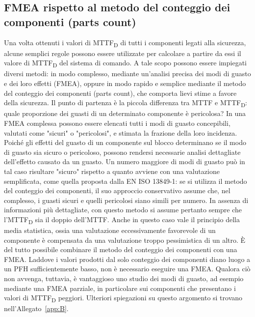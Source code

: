 \subsection{FMEA rispetto al metodo del conteggio dei componenti (parts count)}
\label{subsec:06-2-13}
Una volta ottenuti i valori di MTTF\textsubscript{D} di tutti i componenti legati alla sicurezza, alcune semplici regole possono essere utilizzate per calcolare a partire da essi il valore di MTTF\textsubscript{D} del sistema di comando. A tale scopo possono essere impiegati diversi metodi: in modo complesso, mediante un'analisi precisa dei modi di guasto e dei loro effetti (FMEA), oppure in modo rapido e semplice mediante il metodo del conteggio dei componenti (parts count), che comporta lievi stime a favore della sicurezza. Il punto di partenza è la piccola differenza tra MTTF e MTTF\textsubscript{D}: quale proporzione dei guasti di un determinato componente è pericolosa? In una FMEA complessa possono essere elencati tutti i modi di guasto concepibili, valutati come "sicuri" o "pericolosi", e stimata la frazione della loro incidenza. Poiché gli effetti del guasto di un componente sul blocco determinano se il modo di guasto sia sicuro o pericoloso, possono rendersi necessarie analisi dettagliate dell'effetto causato da un guasto. Un numero maggiore di modi di guasto può in tal caso risultare "sicuro" rispetto a quanto avviene con una valutazione semplificata, come quella proposta dalla EN ISO 13849-1: se si utilizza il metodo del conteggio dei componenti, il suo approccio conservativo assume che, nel complesso, i guasti sicuri e quelli pericolosi siano simili per numero. In assenza di informazioni più dettagliate, con questo metodo si assume pertanto sempre che l'MTTF\textsubscript{D} sia il doppio dell'MTTF.
Anche in questo caso vale il principio della media statistica, ossia una valutazione eccessivamente favorevole di un componente è compensata da una valutazione troppo pessimistica di un altro. È del tutto possibile combinare il metodo del conteggio dei componenti con una FMEA. Laddove i valori prodotti dal solo conteggio dei componenti diano luogo a un PFH sufficientemente basso, non è necessario eseguire una FMEA. Qualora ciò non avvenga, tuttavia, è vantaggioso uno studio dei modi di guasto, ad esempio mediante una FMEA parziale, in particolare sui componenti che presentano i valori di MTTF\textsubscript{D} peggiori. Ulteriori spiegazioni su questo argomento si trovano nell'Allegato~\ref{app:B}.

